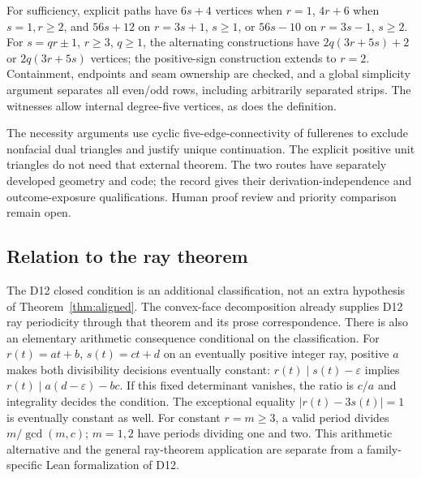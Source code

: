 \documentclass[11pt]{amsart}
\theoremstyle{definition}\newtheorem{definition}{Definition}
\begin{document}
For sufficiency, explicit paths have $6s+4$ vertices when $r=1$,
$4r+6$ when $s=1,r\ge2$, and $56s+12$ on $r=3s+1$, $s\ge1$,
or $56s-10$ on $r=3s-1$, $s\ge2$. For $s=qr\pm1$, $r\ge3$,
$q\ge1$, the alternating constructions have
$2q(3r+5s)+2$ or $2q(3r+5s)$ vertices; the positive-sign
construction extends to $r=2$. Containment, endpoints and seam
ownership are checked, and a global simplicity argument separates
all even/odd rows, including arbitrarily separated strips.
The witnesses allow internal degree-five vertices, as does the definition.

The necessity arguments use cyclic five-edge-connectivity of fullerenes
\cite{Connectivity} to exclude nonfacial dual triangles and justify
unique continuation. The explicit positive unit triangles do not need
that external theorem. The two routes have separately developed
geometry and code; the record gives their derivation-independence and
outcome-exposure qualifications. Human proof review and priority
comparison remain open.

\subsection{Relation to the ray theorem}
The D12 closed condition is an additional classification, not an extra
hypothesis of Theorem~\ref{thm:aligned}. The convex-face decomposition
already supplies D12 ray periodicity through that theorem and its
prose correspondence. There is also an elementary arithmetic
consequence conditional on the classification. For
$r(t)=at+b$, $s(t)=ct+d$ on an eventually positive integer ray,
positive $a$ makes both divisibility decisions eventually constant:
$r(t)\mid s(t)-\varepsilon$ implies
$r(t)\mid a(d-\varepsilon)-bc$. If this fixed determinant vanishes,
the ratio is $c/a$ and integrality decides the condition. The
exceptional equality $|r(t)-3s(t)|=1$ is eventually constant as well.
For constant $r=m\ge3$, a valid period divides $m/\gcd(m,c)$;
$m=1,2$ have periods dividing one and two. This arithmetic alternative
and the general ray-theorem application are separate from a
family-specific Lean formalization of D12.

\appendix
\end{document}

